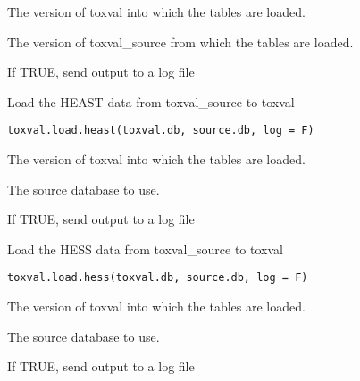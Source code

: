 \documentclass[letterpaper]{book}
\begin{document}
%
\begin{Arguments}
\begin{ldescription}
\item[\code{toxval.db}] The version of toxval into which the tables are loaded.

\item[\code{source.db}] The version of toxval\_source from which the tables are loaded.

\item[\code{log}] If TRUE, send output to a log file
\end{ldescription}
\end{Arguments}
%
\begin{Description}\relax
Load the HEAST data from toxval\_source to toxval
\end{Description}
%
\begin{Usage}
\begin{verbatim}
toxval.load.heast(toxval.db, source.db, log = F)
\end{verbatim}
\end{Usage}
%
\begin{Arguments}
\begin{ldescription}
\item[\code{toxval.db}] The version of toxval into which the tables are loaded.

\item[\code{source.db}] The source database to use.

\item[\code{log}] If TRUE, send output to a log file
\end{ldescription}
\end{Arguments}
%
\begin{Description}\relax
Load the HESS data from toxval\_source to toxval
\end{Description}
%
\begin{Usage}
\begin{verbatim}
toxval.load.hess(toxval.db, source.db, log = F)
\end{verbatim}
\end{Usage}
%
\begin{Arguments}
\begin{ldescription}
\item[\code{toxval.db}] The version of toxval into which the tables are loaded.

\item[\code{source.db}] The source database to use.

\item[\code{log}] If TRUE, send output to a log file
\end{ldescription}
\end{Arguments}
\end{document}
